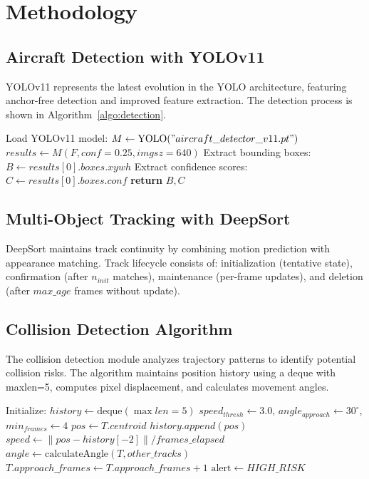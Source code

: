\documentclass[conference]{IEEEtran}
\begin{document}
\section{Methodology}
\label{sec:methodology}

\subsection{Aircraft Detection with YOLOv11}
YOLOv11 represents the latest evolution in the YOLO architecture, featuring anchor-free detection and improved feature extraction. The detection process is shown in Algorithm~\ref{algo:detection}.

\begin{algorithm}[htbp]
\caption{Aircraft Detection Process}
\label{algo:detection}
\begin{algorithmic}[1]
\STATE Load YOLOv11 model: $M \leftarrow \text{YOLO}("aircraft\_detector\_v11.pt")$
\STATE $results \leftarrow M(F, conf=0.25, imgsz=640)$
\STATE Extract bounding boxes: $B \leftarrow results[0].boxes.xywh$
\STATE Extract confidence scores: $C \leftarrow results[0].boxes.conf$
\STATE \textbf{return} $B, C$
\ENDFOR
\end{algorithmic}
\end{algorithm}

\subsection{Multi-Object Tracking with DeepSort}
DeepSort maintains track continuity by combining motion prediction with appearance matching. Track lifecycle consists of: initialization (tentative state), confirmation (after $n_{init}$ matches), maintenance (per-frame updates), and deletion (after $max\_age$ frames without update).

\subsection{Collision Detection Algorithm}
The collision detection module analyzes trajectory patterns to identify potential collision risks. The algorithm maintains position history using a deque with maxlen=5, computes pixel displacement, and calculates movement angles.

\begin{algorithm}[htbp]
\caption{Collision Detection}
\label{algo:collision}
\begin{algorithmic}[1]
\STATE Initialize: $history \leftarrow \text{deque}(\max len=5)$
\STATE $speed_{thresh} \leftarrow 3.0$, $angle_{approach} \leftarrow 30^{\circ}$, $min_{frames} \leftarrow 4$
\STATE $pos \leftarrow T.centroid$
\STATE $history.append(pos)$
\STATE $speed \leftarrow \|pos - history[-2]\| / frames\_elapsed$
\STATE $angle \leftarrow \text{calculateAngle}(T, other\_tracks)$
\STATE $T.approach\_frames \leftarrow T.approach\_frames + 1$
\STATE $\text{alert} \leftarrow HIGH\_RISK$
\ENDIF
\ENDIF
\ENDIF
\ENDFOR
\end{algorithmic}
\end{algorithm}
\end{document}
